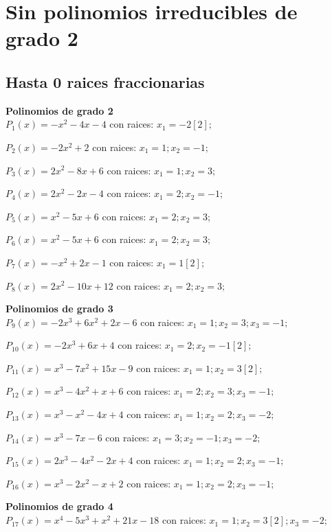 \section{Sin polinomios irreducibles de grado 2}
\subsection{Hasta 0 raices fraccionarias}
\textbf{Polinomios de grado 2\\} 
\subitem $P_{1}(x) = -x^2 - 4x - 4$ con raices: $x_1 = -2[2] ;  $

\subitem $P_{2}(x) = -2x^2 + 2$ con raices: $x_1 = 1 ; x_2 = -1 ;  $

\subitem $P_{3}(x) = 2x^2 - 8x + 6$ con raices: $x_1 = 1 ; x_2 = 3 ;  $

\subitem $P_{4}(x) = 2x^2 - 2x - 4$ con raices: $x_1 = 2 ; x_2 = -1 ;  $

\subitem $P_{5}(x) = x^2 - 5x + 6$ con raices: $x_1 = 2 ; x_2 = 3 ;  $

\subitem $P_{6}(x) = x^2 - 5x + 6$ con raices: $x_1 = 2 ; x_2 = 3 ;  $

\subitem $P_{7}(x) = -x^2 + 2x - 1$ con raices: $x_1 = 1[2] ;  $

\subitem $P_{8}(x) = 2x^2 - 10x + 12$ con raices: $x_1 = 2 ; x_2 = 3 ;  $

\textbf{Polinomios de grado 3\\} 
\subitem $P_{9}(x) = -2x^3 + 6x^2 + 2x - 6$ con raices: $x_1 = 1 ; x_2 = 3 ; x_3 = -1 ;  $

\subitem $P_{10}(x) = -2x^3 + 6x + 4$ con raices: $x_1 = 2 ; x_2 = -1[2] ;  $

\subitem $P_{11}(x) = x^3 - 7x^2 + 15x - 9$ con raices: $x_1 = 1 ; x_2 = 3[2] ;  $

\subitem $P_{12}(x) = x^3 - 4x^2 + x + 6$ con raices: $x_1 = 2 ; x_2 = 3 ; x_3 = -1 ;  $

\subitem $P_{13}(x) = x^3 - x^2 - 4x + 4$ con raices: $x_1 = 1 ; x_2 = 2 ; x_3 = -2 ;  $

\subitem $P_{14}(x) = x^3 - 7x - 6$ con raices: $x_1 = 3 ; x_2 = -1 ; x_3 = -2 ;  $

\subitem $P_{15}(x) = 2x^3 - 4x^2 - 2x + 4$ con raices: $x_1 = 1 ; x_2 = 2 ; x_3 = -1 ;  $

\subitem $P_{16}(x) = x^3 - 2x^2 - x + 2$ con raices: $x_1 = 1 ; x_2 = 2 ; x_3 = -1 ;  $

\textbf{Polinomios de grado 4\\} 
\subitem $P_{17}(x) = x^4 - 5x^3 + x^2 + 21x - 18$ con raices: $x_1 = 1 ; x_2 = 3[2] ; x_3 = -2 ;  $


